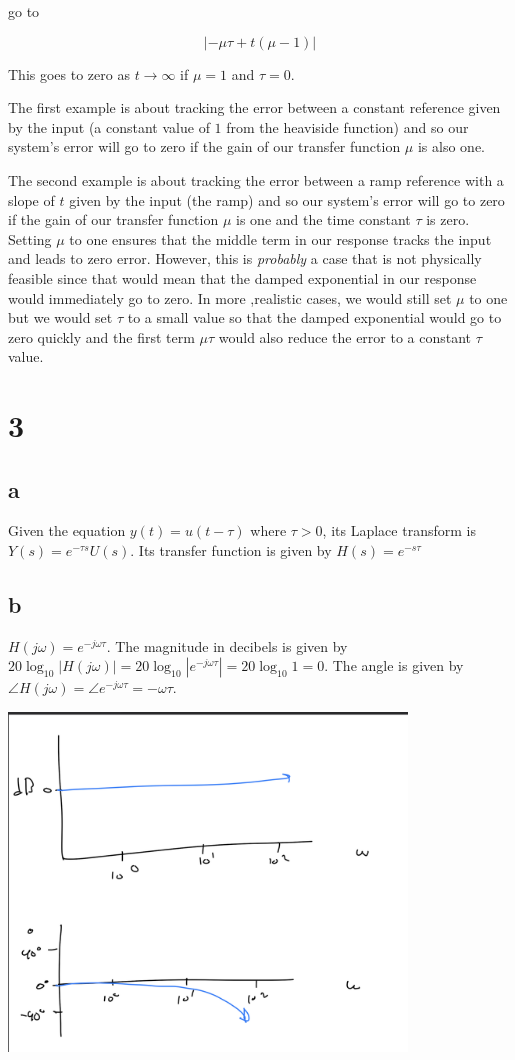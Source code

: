 \documentclass[11pt]{article}
\begin{document}
go to

\[ | -\mu \tau + t (\mu - 1) | \]

This goes to zero as $t \to \infty$ if $\mu = 1$ and $\tau = 0$.

The first example is about tracking the error between a constant reference given by the input (a constant value of $1$ from the heaviside function) and so our system's error will go to zero if the gain of our transfer function $\mu$ is also one.

The second example is about tracking the error between a ramp reference with a slope of $t$ given by the input (the ramp) and so our system's error will go to zero if the gain of our transfer function $\mu$ is one and the time constant $\tau$ is zero. Setting $\mu$ to one ensures that the middle term in our response tracks the input and leads to zero error. However, this is \textit{probably} a case that is not physically feasible since that would mean that the damped exponential in our response would immediately go to zero. In more ,realistic cases, we would still set $\mu$ to one but we would set $\tau$ to a small value so that the damped exponential would go to zero quickly and the first term $\mu \tau$ would also reduce the error to a constant $\tau$ value.

\section{3}

\subsection{a}

Given the equation $y(t) = u(t - \tau)$ where $\tau > 0$, its Laplace transform is $Y(s) = e^{-\tau s} U(s)$. Its transfer function is given by $H(s) = e^{-s \tau}$

\subsection{b}

$H(j\omega) = e^{-j \omega \tau}$. The magnitude in decibels is given by $20 \log_{10} |H(j\omega)| = 20 \log_{10} |e^{-j \omega \tau}| = 20 \log_{10} 1 = 0$. The angle is given by $\angle H(j\omega) = \angle e^{-j \omega \tau} = -\omega \tau$.

\includegraphics[width=300pt]{a2_q3.png}
\end{document}
